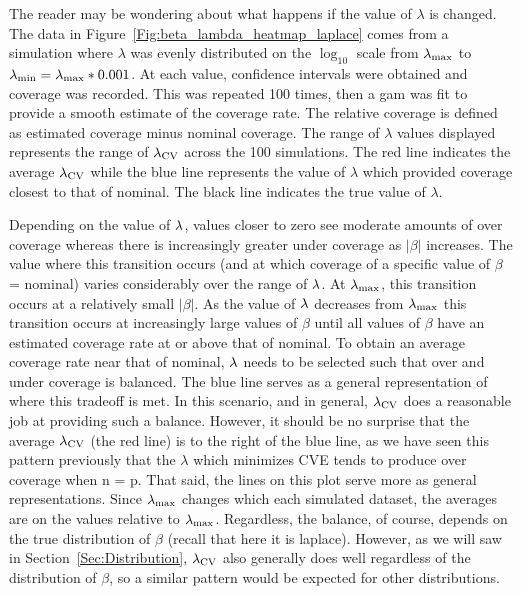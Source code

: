 The reader may be wondering about what happens if the value of $\lambda$ is changed. The data in Figure~\ref{Fig:beta_lambda_heatmap_laplace} comes from a simulation where $\lambda$ was evenly distributed on the $\log_{10}$ scale from $\lambda_{\max}$ to $\lambda_{\min} = \lambda_{\max} * 0.001$. At each value, confidence intervals were obtained and coverage was recorded. This was repeated 100 times, then a gam was fit to provide a smooth estimate of the coverage rate. The relative coverage is defined as estimated coverage minus nominal coverage. The range of $\lambda$ values displayed represents the range of $\lambda_{\textrm{CV}}$ across the 100 simulations. The red line indicates the average $\lambda_{\textrm{CV}}$ while the blue line represents the value of $\lambda$ which provided coverage closest to that of nominal. The black line indicates the true value of $\lambda$.

Depending on the value of $\lambda$, values closer to zero see moderate amounts of over coverage whereas there is increasingly greater under coverage as $|\beta|$ increases. The value where this transition occurs (and at which coverage of a specific value of $\beta$ = nominal) varies considerably over the range of $\lambda$. At $\lambda_{\max}$, this transition occurs at a relatively small $|\beta|$. As the value of $\lambda$ decreases from $\lambda_{\max}$ this transition occurs at increasingly large values of $\beta$ until all values of $\beta$ have an estimated coverage rate at or above that of nominal. To obtain an average coverage rate near that of nominal, $\lambda$ needs to be selected such that over and under coverage is balanced. The blue line serves as a general representation of where this tradeoff is met. In this scenario, and in general, $\lambda_{\textrm{CV}}$ does a reasonable job at providing such a balance. However, it should be no surprise that the average $\lambda_{\textrm{CV}}$ (the red line) is to the right of the blue line, as we have seen this pattern previously that the $\lambda$ which minimizes CVE tends to produce over coverage when n = p. That said, the lines on this plot serve more as general representations. Since $\lambda_{\max}$ changes which each simulated dataset, the averages are on the values relative to $\lambda_{\max}$. Regardless, the balance, of course, depends on the true distribution of $\beta$ (recall that here it is laplace). However, as we will saw in Section~\ref{Sec:Distribution}, $\lambda_{\textrm{CV}}$ also generally does well regardless of the distribution of $\beta$, so a similar pattern would be expected for other distributions.

